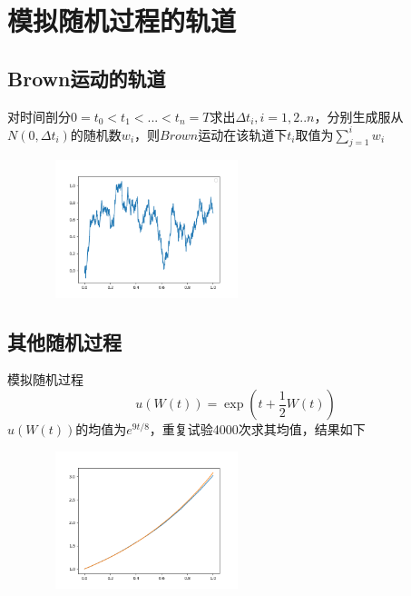 \documentclass{article}%
\begin{document}
\section{模拟随机过程的轨道}
\subsection{Brown运动的轨道}
对时间剖分$0=t_0<t_1<...<t_n=T$求出$\Delta t_i,i=1,2..n$，分别生成服从$N(0,\Delta t_i)$的随机数$w_i$，则$Brown$运动在该轨道下$t_i$取值为$\sum\limits_{j=1}^iw_i$
\begin{figure}[h]
\centering
\includegraphics[width=6cm,height=4cm]{Figure_1.png}\\
\centering	
\end{figure}
\subsection{其他随机过程}
模拟随机过程
\begin{equation}
u(W(t))=\exp \left(t+\frac{1}{2} W(t)\right)
\end{equation}
$u(W(t))$的均值为$e^{9t/8}$，重复试验4000次求其均值，结果如下
\begin{figure}[H]
	\centering
	\includegraphics[width=6cm,height=4cm]{Figure_2.png}\\
	\centering	
\end{figure}
\end{document}
